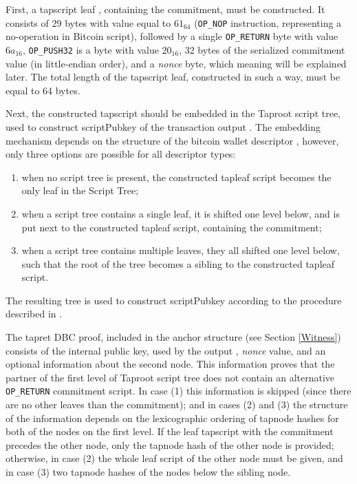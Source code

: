 \documentclass[9pt,oneside]{amsart}
\begin{document}
\begin{multicols}{2}
First, a tapscript leaf \cite{BIP342}, containing the commitment, must be constructed.
It consists of 29 bytes with value equal to $61_{64}$
(\verb|OP_NOP| instruction, representing a no-operation in Bitcoin script),
followed by a single \verb|OP_RETURN| byte with value $6a_{16}$,
\verb|OP_PUSH32| is a byte with value $20_{16}$,
32 bytes of the serialized commitment value (in little-endian order),
and a \emph{nonce} byte, which meaning will be explained later.
The total length of the tapscript leaf, constructed in such a way, must be equal to 64 bytes.

Next, the constructed tapscript should be embedded in the Taproot script tree,
used to construct \textsf{scriptPubkey} of the transaction output \cite{BIP341}.
The embedding mechanism depends on the structure of the bitcoin wallet descriptor \cite{BIP380},
however, only three options are possible for all descriptor types:
\noindent
\begin{enumerate}
\item when no script tree is present,
    the constructed tapleaf script becomes the only leaf in the Script Tree;
\item when a script tree contains a single leaf, it is shifted one level below,
    and is put next to the constructed tapleaf script, containing the commitment;
\item when a script tree contains multiple leaves, they all shifted one level below,
    such that the root of the tree becomes a sibling to the constructed tapleaf script.
\end{enumerate}
\noindent
The resulting tree is used to construct \textsf{scriptPubkey}
according to the procedure described in \cite{BIP341}.

The tapret DBC proof, included in the \gls{anchor} structure (see Section \ref{Witness})
consists of the internal public key, used by the output \cite{BIP341},
\emph{nonce} value, and an optional information about the second node.
This information proves that the partner of the first level of Taproot script tree
does not contain an alternative \verb|OP_RETURN| commitment script.
In case (1) this information is skipped (since there are no other leaves than the commitment);
and in cases (2) and (3) the structure of the information depends on the lexicographic ordering
of tapnode hashes \cite{BIP341} for both of the nodes on the first level.
If the leaf tapscript with the commitment precedes the other node,
only the tapnode hash of the other node is provided;
otherwise, in case (2) the whole leaf script of the other node must be given,
and in case (3) two tapnode hashes of the nodes below the sibling node.


\end{multicols}
\end{document}
